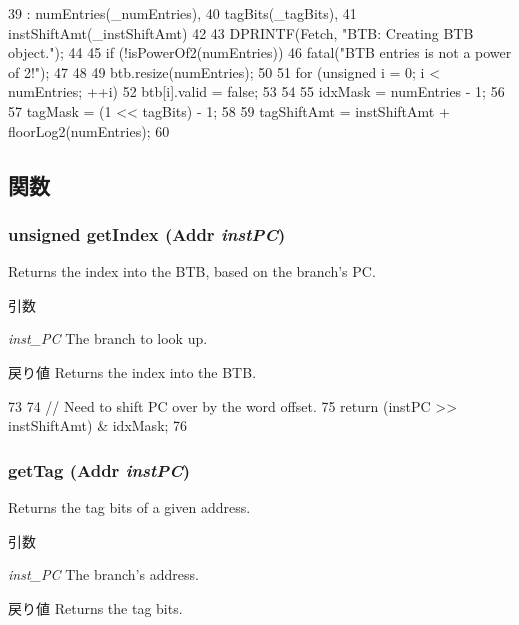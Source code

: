 \begin{DoxyCode}
39     : numEntries(_numEntries),
40       tagBits(_tagBits),
41       instShiftAmt(_instShiftAmt)
42 {
43     DPRINTF(Fetch, "BTB: Creating BTB object.\n");
44 
45     if (!isPowerOf2(numEntries)) {
46         fatal("BTB entries is not a power of 2!");
47     }
48 
49     btb.resize(numEntries);
50 
51     for (unsigned i = 0; i < numEntries; ++i) {
52         btb[i].valid = false;
53     }
54 
55     idxMask = numEntries - 1;
56 
57     tagMask = (1 << tagBits) - 1;
58 
59     tagShiftAmt = instShiftAmt + floorLog2(numEntries);
60 }
\end{DoxyCode}


\subsection{関数}
\hypertarget{classDefaultBTB_a8b650cb1fd2b3463eacf1966bafd2140}{
\subsubsection[{getIndex}]{\setlength{\rightskip}{0pt plus 5cm}unsigned getIndex ({\bf Addr} {\em instPC})}}
\label{classDefaultBTB_a8b650cb1fd2b3463eacf1966bafd2140}
Returns the index into the BTB, based on the branch's PC. 
\begin{DoxyParams}{引数}
\item[{\em inst\_\-PC}]The branch to look up. \end{DoxyParams}
\begin{DoxyReturn}{戻り値}
Returns the index into the BTB. 
\end{DoxyReturn}



\begin{DoxyCode}
73 {
74     // Need to shift PC over by the word offset.
75     return (instPC >> instShiftAmt) & idxMask;
76 }
\end{DoxyCode}
\hypertarget{classDefaultBTB_a16700c6e462c3dc0d378192ebd4818e1}{
\subsubsection[{getTag}]{ getTag ({\bf Addr} {\em instPC})}}
\label{classDefaultBTB_a16700c6e462c3dc0d378192ebd4818e1}
Returns the tag bits of a given address. 
\begin{DoxyParams}{引数}
\item[{\em inst\_\-PC}]The branch's address. \end{DoxyParams}
\begin{DoxyReturn}{戻り値}
Returns the tag bits. 
\end{DoxyReturn}



